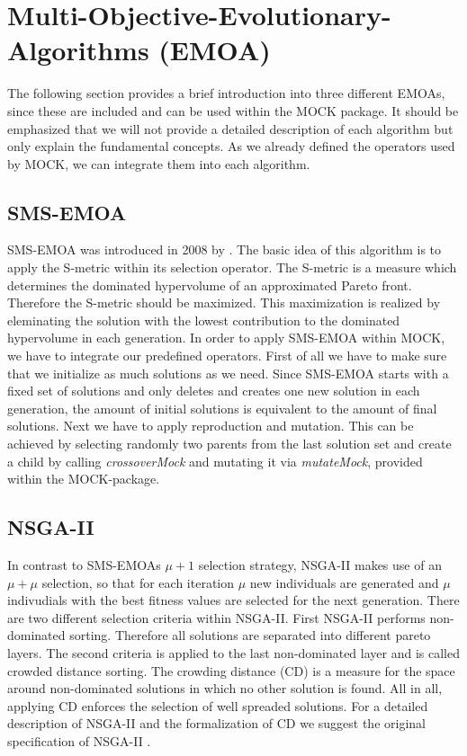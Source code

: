 \documentclass[parskip=half,DIV=14]{scrartcl}\usepackage[]{graphicx}\usepackage[]{color}
\begin{document}
\section{Multi-Objective-Evolutionary-Algorithms (EMOA)}
The following section provides a brief introduction into three different EMOAs, since these are included and can be used within the MOCK package. It should be emphasized that we will not provide a detailed description of each algorithm but only explain the fundamental concepts. As we already defined the operators used by MOCK, we can integrate them into each algorithm.
\subsection{SMS-EMOA}
SMS-EMOA was introduced in 2008 by \textcite{smsemoa}. The basic idea of this algorithm is to apply the S-metric within its selection operator. The S-metric is a measure which determines the dominated hypervolume of an approximated Pareto front. Therefore the S-metric should be maximized. This maximization is realized by eleminating the solution with the lowest contribution to the dominated hypervolume in each generation. In order to apply SMS-EMOA within MOCK, we have to integrate our predefined operators. First of all we have to make sure that we initialize as much solutions as we need. Since SMS-EMOA starts with a fixed set of solutions and only deletes and creates one new solution in each generation, the amount of initial solutions is equivalent to the amount of final solutions. Next we have to apply reproduction and mutation. This can be achieved by selecting randomly two parents from the last solution set and create a child by calling \textit{crossoverMock} and mutating it via \textit{mutateMock}, provided within the MOCK-package. 

\subsection{NSGA-II}
In contrast to SMS-EMOAs $\mu + 1$ selection strategy, NSGA-II \cite{nsga2} makes use of an $\mu + \mu $ selection, so that for each iteration $\mu$ new individuals are generated and $\mu$ indivudials with the best fitness values are selected for the next generation. There are two different selection criteria within NSGA-II. First NSGA-II performs non-dominated sorting. Therefore all solutions are separated into different pareto layers. The second criteria is applied to the last non-dominated layer and is called crowded distance sorting. The crowding distance (CD) is a measure for the space around non-dominated solutions in which no other solution is found. All in all, applying CD enforces the selection of well spreaded solutions. For a detailed description of NSGA-II and the formalization of CD we suggest the original specification of NSGA-II \cite{nsga2}. 
\end{document}

